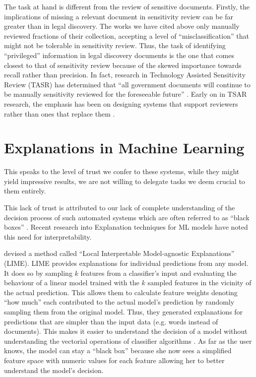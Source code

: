 \documentclass[\version]{l4proj}
\begin{document}
The task at hand is different from the review of sensitive documents.
Firstly, the implications of missing a relevant document in sensitivity review can be far greater than in legal discovery.
The works we have cited above only manually reviewed fractions of their collection, accepting a level of ``misclassification'' that might not be tolerable in sensitivity review.
Thus, the task of identifying ``privileged'' information in legal discovery documents is the one that comes closest to that of sensitivity review \autocite{berardiSemiAutomatedTextClassification2015} because of the skewed importance towards recall rather than precision.
In fact, research in Technology Assisted Sensitivity Review (TASR) has determined that ``all government documents will continue to be manually sensitivity reviewed for the foreseeable future'' \autocite[1]{mcdonaldHowSensitivityClassification2019}.
Early on in TSAR research, the emphasis has been on designing systems that support reviewers rather than ones that replace them \autocite{mcdonaldClassifierDigitalSensitivity2014}.

\section{Explanations in Machine Learning}

This speaks to the level of trust we confer to these systems, while they might yield impressive results, we are not willing to delegate tasks we deem crucial to them entirely.

This lack of trust is attributed to our lack of complete understanding of the decision process of such automated systems which are often referred to as ``black boxes'' \autocite{ribeiroWhyShouldTrust2016}.
Recent research into Explanation techniques for ML models have noted this need for interpretability.

\textcite{ribeiroWhyShouldTrust2016} devised a method called ``Local Interpretable Model-agnostic Explanations'' (LIME).
LIME provides explanations for individual predictions from any model.
It does so by sampling $k$ features from a classifier's input and evaluating the behaviour of a linear model trained with the $k$ sampled features in the vicinity of the actual prediction.
This allows them to calculate feature weights denoting ``how much'' each contributed to the actual model's prediction by randomly sampling them from the original model.
Thus, they generated explanations for predictions that are simpler than the input data (e.g. words instead of documents).
This makes it easier to understand the decision of a model without understanding the vectorial operations of classifier algorithms .
As far as the user knows, the model can stay a ``black box'' because she now sees a simplified feature space with numeric values for each feature allowing her to better understand the model's decision.
\end{document}

